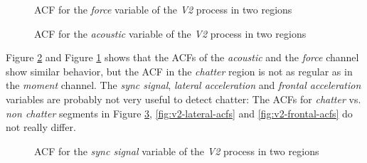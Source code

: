 \documentclass[12 pt]{scrartcl}
\begin{document}
\begin{figure}[p]
  \caption{ACF for the \emph{force} variable of the \emph{V2} process in two regions}
  \label{fig:v2-force-acfs}
\end{figure}


\begin{figure}[p]
  \caption{ACF for the \emph{acoustic} variable of the \emph{V2} process in two regions}
  \label{fig:v2-acoustic-acfs}
\end{figure}

Figure \ref{fig:v2-acoustic-acfs} and  Figure \ref{fig:v2-force-acfs} shows that the ACFs of the \emph{acoustic} and the \emph{force} channel show similar behavior, but the ACF in the \emph{chatter} region is not as regular as in the \emph{moment} channel. The \emph{sync signal},
\emph{lateral acceleration} and \emph{frontal acceleration} variables are probably not very useful to detect chatter: The ACFs for \emph{chatter} vs. \emph{non chatter} segments in Figure \ref{fig:v2-sync-acfs}, \ref{fig:v2-lateral-acfs} and \ref{fig:v2-frontal-acfs} do not really differ.


\begin{figure}[p]
  \caption{ACF for the \emph{sync signal} variable of the \emph{V2} process in two regions}
  \label{fig:v2-sync-acfs}
\end{figure}
\end{document}
